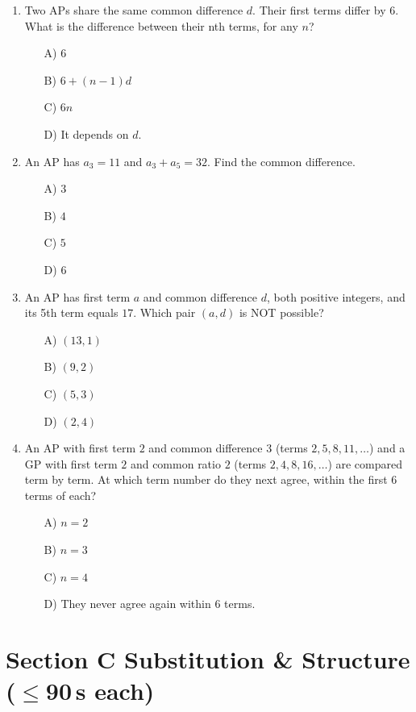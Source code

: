 \documentclass[11pt,a4paper]{article}
\begin{document}
\begin{enumerate}
\item Two APs share the same common difference $d$. Their first terms differ by $6$. What is the difference between their nth terms, for any $n$?
\begin{itemize}
\item[A)] $6$
\item[B)] $6+(n-1)d$
\item[C)] $6n$
\item[D)] It depends on $d$.
\end{itemize}

\item An AP has $a_3=11$ and $a_3+a_5=32$. Find the common difference.
\begin{itemize}
\item[A)] $3$
\item[B)] $4$
\item[C)] $5$
\item[D)] $6$
\end{itemize}

\item An AP has first term $a$ and common difference $d$, both positive integers, and its 5th term equals $17$. Which pair $(a,d)$ is NOT possible?
\begin{itemize}
\item[A)] $(13,1)$
\item[B)] $(9,2)$
\item[C)] $(5,3)$
\item[D)] $(2,4)$
\end{itemize}

\item An AP with first term $2$ and common difference $3$ (terms $2,5,8,11,\ldots$) and a GP with first term $2$ and common ratio $2$ (terms $2,4,8,16,\ldots$) are compared term by term. At which term number do they next agree, within the first 6 terms of each?
\begin{itemize}
\item[A)] $n=2$
\item[B)] $n=3$
\item[C)] $n=4$
\item[D)] They never agree again within 6 terms.
\end{itemize}

\end{enumerate}

\section*{Section C \quad Substitution \& Structure \hfill{\normalfont\small($\leq$90\,s each)}}
\end{document}
